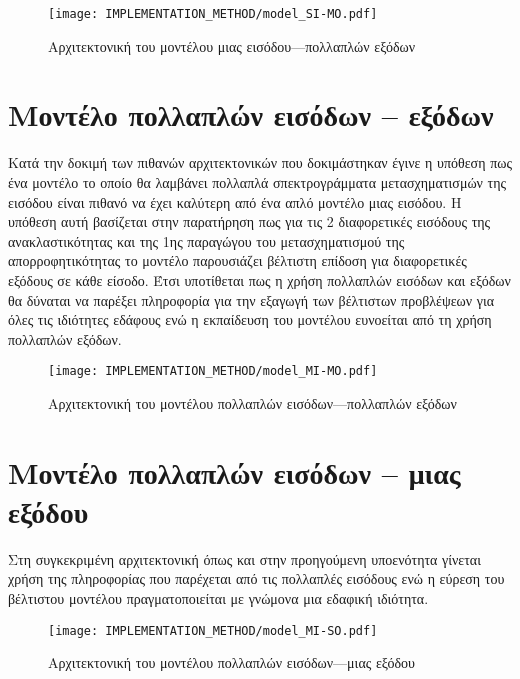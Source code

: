 \begin{figure}[H]
  \begin{center}
    \texttt{[image: IMPLEMENTATION\_METHOD/model\_SI-MO.pdf]}
    \caption{Αρχιτεκτονική του μοντέλου μιας εισόδου---πολλαπλών εξόδων}
  \end{center}
\end{figure}

\section{Μοντέλο πολλαπλών εισόδων -- εξόδων}
Κατά την δοκιμή των πιθανών αρχιτεκτονικών που δοκιμάστηκαν έγινε η υπόθεση πως ένα μοντέλο το οποίο θα λαμβάνει πολλαπλά σπεκτρογράμματα μετασχηματισμών της εισόδου είναι πιθανό να έχει καλύτερη από ένα απλό μοντέλο μιας εισόδου. Η υπόθεση αυτή βασίζεται στην παρατήρηση πως για τις 2 διαφορετικές εισόδους της ανακλαστικότητας και της 1ης παραγώγου του μετασχηματισμού   της απορροφητικότητας το μοντέλο παρουσιάζει βέλτιστη επίδοση για διαφορετικές εξόδους σε κάθε είσοδο. Έτσι υποτίθεται πως η χρήση πολλαπλών εισόδων και εξόδων θα δύναται να παρέξει πληροφορία για την εξαγωγή των βέλτιστων προβλέψεων για όλες τις ιδιότητες εδάφους ενώ η εκπαίδευση του μοντέλου ευνοείται από τη χρήση πολλαπλών εξόδων.

\begin{figure}[H]
  \begin{center}
    \texttt{[image: IMPLEMENTATION\_METHOD/model\_MI-MO.pdf]}
    \caption{Αρχιτεκτονική του μοντέλου πολλαπλών εισόδων---πολλαπλών εξόδων}
  \end{center}
\end{figure}

\section{Μοντέλο πολλαπλών εισόδων -- μιας εξόδου}
Στη συγκεκριμένη αρχιτεκτονική όπως και στην προηγούμενη υποενότητα γίνεται χρήση της πληροφορίας που παρέχεται από τις πολλαπλές εισόδους ενώ η εύρεση του βέλτιστου μοντέλου πραγματοποιείται με γνώμονα μια εδαφική ιδιότητα.
\begin{figure}[H]
  \begin{center}
    \texttt{[image: IMPLEMENTATION\_METHOD/model\_MI-SO.pdf]}
    \caption{Αρχιτεκτονική του μοντέλου πολλαπλών εισόδων---μιας εξόδου}
  \end{center}
\end{figure}
